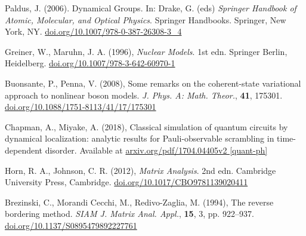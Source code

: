 \documentclass[12pt]{article}
\begin{document}
	\begin{thebibliography}{10}
	
	Paldus, J. (2006). Dynamical Groups. In: Drake, G. (eds) \textit{Springer Handbook of Atomic, Molecular, and Optical Physics}. Springer Handbooks. Springer, New York, NY. \href{https://doi.org/10.1007/978-0-387-26308-3\_4}{doi.org/10.1007/978-0-387-26308-3\_4}
	
	Greiner, W., Maruhn, J. A. (1996), \textit{Nuclear Models}. 1st edn. Springer Berlin, Heidelberg. \href{https://doi.org/10.1007/978-3-642-60970-1}{doi.org/10.1007/978-3-642-60970-1}
	
	Buonsante, P., Penna, V. (2008), Some remarks on the coherent-state variational approach to nonlinear boson models. \textit{J. Phys. A: Math. Theor.}, \textbf{41}, 175301. \href{https://doi.org/10.1088/1751-8113/41/17/175301}{doi.org/10.1088/1751-8113/41/17/175301}
	
	Chapman, A., Miyake, A. (2018), Classical simulation of quantum circuits by dynamical localization: analytic results for Pauli-observable scrambling in time-dependent disorder. Available at \href{https://arxiv.org/pdf/1704.04405v2}{arxiv.org/pdf/1704.04405v2 [quant-ph]}
	
	Horn, R. A., Johnson, C. R. (2012), \textit{Matrix Analysis}. 2nd edn. Cambridge University Press, Cambridge. \href{https://doi.org/10.1017/CBO9781139020411}{doi.org/10.1017/CBO9781139020411 }
	
	 Brezinski, C., Morandi Cecchi, M., Redivo-Zaglia, M. (1994), The reverse bordering method. \textit{SIAM J. Matrix Anal. Appl.}, \textbf{15}, 3, pp. 922--937. \href{https://doi.org/10.1137/S0895479892227761}{doi.org/10.1137/S0895479892227761}

	\end{thebibliography}	
	
\end{document}
